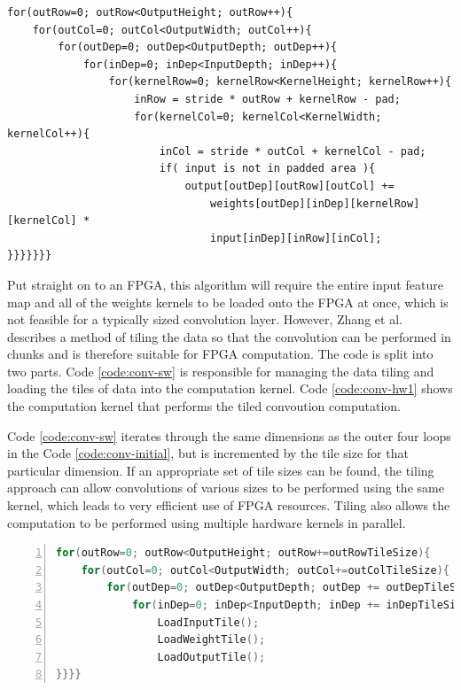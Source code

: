 \documentclass[12pt]{article}
\begin{document}
\renewcommand{\lstlistingname}{Code}
\begin{lstlisting}[caption=Basic Convolution, label=code:conv-initial]
for(outRow=0; outRow<OutputHeight; outRow++){
	for(outCol=0; outCol<OutputWidth; outCol++){
		for(outDep=0; outDep<OutputDepth; outDep++){
			for(inDep=0; inDep<InputDepth; inDep++){      
				for(kernelRow=0; kernelRow<KernelHeight; kernelRow++){        
					inRow = stride * outRow + kernelRow - pad;
					for(kernelCol=0; kernelCol<KernelWidth; kernelCol++){          
						inCol = stride * outCol + kernelCol - pad;
						if( input is not in padded area ){
							output[outDep][outRow][outCol] +=
								weights[outDep][inDep][kernelRow][kernelCol] *
								input[inDep][inRow][inCol];
}}}}}}}
\end{lstlisting} 

Put straight on to an FPGA, this algorithm will require the entire input feature map and all of the weights kernels to be loaded onto the FPGA at once, which is not feasible for a typically sized convolution layer. However, Zhang et al. describes a method of tiling the data so that the convolution can be performed in chunks and is therefore suitable for FPGA computation. The code is split into two parts. Code \ref{code:conv-sw}  is responsible for managing the data tiling and loading the tiles of data into the computation kernel. Code \ref{code:conv-hw1} shows the computation kernel that performs the tiled convoution computation.

Code \ref{code:conv-sw} iterates through the same dimensions as the outer four loops in the Code \ref{code:conv-initial}, but is incremented by the tile size for that particular dimension. If an appropriate set of tile sizes can be found, the tiling approach can allow convolutions of various sizes to be performed using the same kernel, which leads to very efficient use of FPGA resources. Tiling also allows the computation to be performed using multiple hardware kernels in parallel.

\renewcommand{\lstlistingname}{Code}
\begin{lstlisting}[frame=single, caption=External Data Transfer, label=code:conv-sw, captionpos=b, numbers=left, language=C]
for(outRow=0; outRow<OutputHeight; outRow+=outRowTileSize){
	for(outCol=0; outCol<OutputWidth; outCol+=outColTileSize){
		for(outDep=0; outDep<OutputDepth; outDep += outDepTileSize){
			for(inDep=0; inDep<InputDepth; inDep += inDepTileSize){
				LoadInputTile();
				LoadWeightTile();
				LoadOutputTile();
}}}}
\end{lstlisting} 
\end{document}
